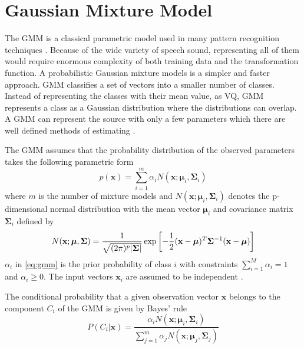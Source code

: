 \section{Gaussian Mixture Model} %
\label{sec:gaussian_mixture_model}
The GMM is a classical parametric model used in many pattern recognition techniques \cite{stylianou98}. Because of the wide variety of speech sound, representing all of them would require enormous complexity of both training data and the transformation function. A probabilistic Gaussian mixture models is a simpler and faster approach. GMM classifies a set of vectors into a smaller number of classes. Instead of representing the classes with their mean value, as VQ, GMM represents a class as a Gaussian distribution where the distributions can overlap. A GMM can represent the source with only a few parameters which there are well defined methods of estimating \cite{taletek}.

The GMM assumes that the probability distribution of the observed parameters takes the following parametric form
\begin{equation}
	\label{eq:gmm}
	p(\mathbf{x}) = \sum_{i=1}^{m} \alpha_i N(\mathbf{x}; \boldsymbol{\mu}_i, \mathbf{\Sigma}_i)
\end{equation}
where $m$ is the number of mixture models and $N(\mathbf{x}; \boldsymbol{\mu}_i, \mathbf{\Sigma}_i)$ denotes the p-dimensional normal distribution \cite{statistikk} with the mean vector $\boldsymbol{\mu}_i$ and covariance matrix $\mathbf{\Sigma}_i$ defined by
\begin{equation}
	N(\mathbf{x}; \boldsymbol{\mu}, \mathbf{\Sigma}) = \frac{1}{\sqrt{(2\pi)^p\lvert\mathbf{\Sigma}\rvert}} \exp\left[ -\frac{1}{2} (\mathbf{x} -\boldsymbol{\mu})^T \mathbf{\Sigma}^{-1} (\mathbf{x} -\boldsymbol{\mu})\right]
\end{equation}
$\alpha_i$ in \eqref{eq:gmm} is the prior probability of class $i$ with constraints $\sum_{i=1}^{M}\alpha_i = 1$ and $\alpha_i \geq 0$. The input vectors $\mathbf{x}_i$ are assumed to be independent \cite{stylianou98}.

The conditional probability that a given observation vector $\mathbf{x}$ belongs to the component $C_i$ of the GMM is given by Bayes' rule \cite{statistikk}
\begin{equation}
	\label{eq:bayes}
	P(C_i\vert \mathbf{x}) = \frac{\alpha_i N(\mathbf{x}; \boldsymbol{\mu}_i, \mathbf{\Sigma}_i)}{\sum_{j=1}^{m}\alpha_j N(\mathbf{x}; \boldsymbol{\mu}_j, \mathbf{\Sigma}_j)}
\end{equation}


